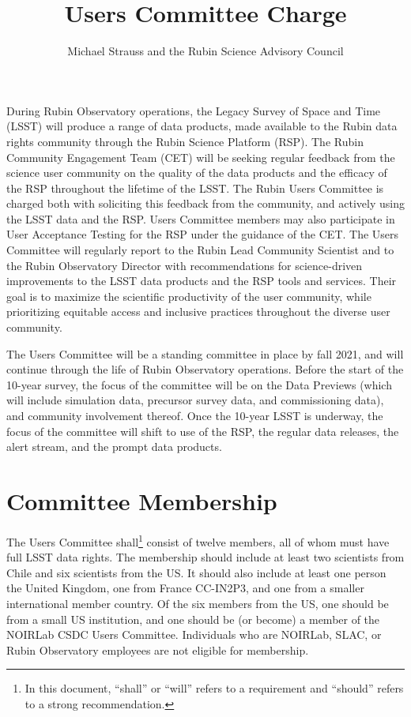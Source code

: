 \documentclass[OPS,toc]{lsstdoc}
\title{Users Committee Charge}
\author{%
Michael Strauss and the Rubin Science Advisory Council
}
\date{\vcsDate}
\begin{document}
\maketitle

During Rubin Observatory operations, the Legacy Survey of Space and Time (LSST) will produce a range of data products, made available to the Rubin data rights community through the Rubin Science Platform (RSP).
The Rubin Community Engagement Team (CET) will be seeking regular feedback from the science user community on the quality of the data products and the efficacy of the RSP throughout the lifetime of the LSST.
The Rubin Users Committee is charged both with soliciting this feedback from the community, and actively using the LSST data and the RSP.
Users Committee members may also participate in User Acceptance Testing for the RSP under the guidance of the CET.
The Users Committee will regularly report to the Rubin Lead Community Scientist and to the Rubin Observatory Director with recommendations for science-driven improvements to the LSST data products and the RSP tools and services.
Their goal is to maximize the scientific productivity of the user community, while prioritizing equitable access and inclusive practices throughout the diverse user community. 

The Users Committee will be a standing committee in place by fall 2021, and will continue through the life of Rubin Observatory operations.
Before the start of the 10-year survey, the focus of the committee will be on the Data Previews (which will include simulation data, precursor survey data, and commissioning data), and community involvement thereof.
Once the 10-year LSST is underway, the focus of the committee will shift to use of the RSP, the regular data releases, the alert stream, and the prompt data products.  

\section{Committee Membership}

The Users Committee shall\footnote{In this document, “shall” or “will” refers to a requirement and “should” refers to a strong recommendation.} consist of twelve members, all of whom must have full LSST data rights.
The membership should include at least two scientists from Chile and six scientists from the US.
It should also include at least one person the United Kingdom, one from France CC-IN2P3, and one from a smaller international member country.
Of the six members from the US, one should be from a small US institution, and one should be (or become) a member of the NOIRLab CSDC Users Committee.
Individuals who are NOIRLab, SLAC, or Rubin Observatory employees are not eligible for membership. 
\end{document}
